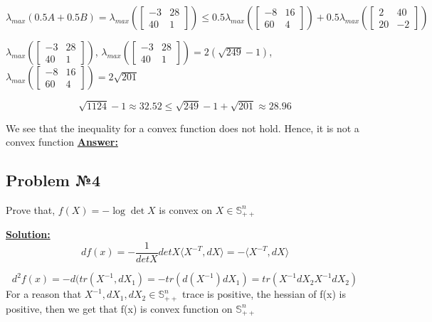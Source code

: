 \begin{equation*}
    \lambda_{max}(0.5 A + 0.5B) = \lambda_{max} \left( \begin{bmatrix}
        -3 & 28 \\
        40 & 1
    \end{bmatrix} \right) \leq 0.5 \lambda_{max}\left(\begin{bmatrix}
    -8 & 16 \\
    60 & 4 
\end{bmatrix} \right) + 0.5 \lambda_{max}\left( \begin{bmatrix}
    2 & 40 \\
    20 & -2
\end{bmatrix}\right)
\end{equation*}

$ \lambda_{max} \left( \begin{bmatrix}
        -3 & 28 \\
        40 & 1
    \end{bmatrix} \right)$, $\lambda_{max}\left( \begin{bmatrix}
        -3 & 28 \\
        40 & 1
    \end{bmatrix} \right) = 2(\sqrt{249} - 1)$, $\lambda_{max} \left(\begin{bmatrix}
    -8 & 16 \\
    60 & 4 
\end{bmatrix} \right) = 2\sqrt{201}$

\begin{equation*}
    \sqrt{1124} - 1 \approx 32.52 \leq \sqrt{249} - 1 + \sqrt{201} \approx 28.96
\end{equation*}

We see that the inequality for a convex function does not hold. Hence, it is not a convex function
\underline{\textbf{Answer:}}

\subsection{Problem №4}
Prove that, $f(X) = - \log \det X$ is convex on $X \in \mathds{S}_{++}^n$

\underline{\textbf{Solution:}}
\begin{equation*}
df(x) = - \frac{1}{detX} detX \langle X^{-T}, dX \rangle = - \langle X^{-T}, dX \rangle
\end{equation*}

\begin{equation*}
    d^2f(x) = -d(tr(X^{-1}, dX_1) = -tr(d(X^{-1})dX_1) = tr(X^{-1}dX_2X^{-1}dX_2)
\end{equation*}
For a reason that $X^{-1}, dX_1, dX_2 \in \mathds{S}_{++}^n$ trace is positive, the hessian of f(x) is positive, then we get that f(x) is convex function on $\mathds{S}_{++}^n$


